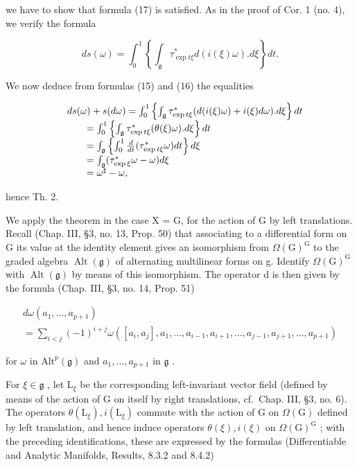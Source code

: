 we have to show that formula (17) is satisfied. As in the proof of Cor. 1 (no. 4), we verify the formula

\[
d s (\omega) = \int_ {0} ^ {1} \left\{\int_ {\mathfrak {g}} \tau_ {\exp t \xi} ^ {*} d (i (\xi) \omega). d \xi \right\} d t.
\]

We now deduce from formulas (15) and (16) the equalities

\[
\begin{array}{r l} & {d s (\omega) + s (d \omega) = \int_ {0} ^ {1} \left\{\int_ {\mathfrak {g}} \tau_ {\exp t \xi} ^ {*} (d (i (\xi) \omega) + i (\xi) d \omega). d \xi \right\} d t} \\ & {\qquad = \int_ {0} ^ {1} \left\{\int_ {\mathfrak {g}} \tau_ {\exp t \xi} ^ {*} (\theta (\xi) \omega). d \xi \right\} d t} \\ & {\qquad = \int_ {\mathfrak {g}} \left\{\int_ {0} ^ {1} \frac {d}{d t} (\tau_ {\exp t \xi} ^ {*} \omega) d t \right\} d \xi} \\ & {\qquad = \int_ {\mathfrak {g}} (\tau_ {\exp \xi} ^ {*} \omega - \omega) d \xi} \\ & {\qquad = \omega^ {\sharp} - \omega ,} \end{array}
\]

hence Th. 2.

We apply the theorem in the case X = G, for the action of G by left translations. Recall (Chap. III, §3, no. 13, Prop. 50) that associating to a differential form on G its value at the identity element gives an isomorphism from \(\Omega(\mathrm{G})^{\mathrm{G}}\) to the graded algebra \(\operatorname{Alt}(\mathfrak{g})\) of alternating multilinear forms on g. Identify \(\Omega(\mathrm{G})^{\mathrm{G}}\) with \(\operatorname{Alt}(\mathfrak{g})\) by means of this isomorphism. The operator d is then given by the formula (Chap. III, §3, no. 14, Prop. 51)

\[
\begin{array}{l} d \omega (a _ {1}, \ldots , a _ {p + 1}) \\ = \sum_ {i <   j} (- 1) ^ {i + j} \omega ([ a _ {i}, a _ {j} ], a _ {1}, \ldots , a _ {i - 1}, a _ {i + 1}, \ldots , a _ {j - 1}, a _ {j + 1}, \ldots , a _ {p + 1}) \end{array}
\]

for \(\omega\) in \(\mathrm{Alt}^p (\mathfrak{g})\) and \(a_1,\ldots ,a_{p + 1}\) in \(\mathfrak{g}\) .

For \(\xi \in \mathfrak{g}\) , let \(\mathrm{L}_{\xi}\) be the corresponding left-invariant vector field (defined by means of the action of G on itself by right translations, cf.~Chap. III, §3, no. 6). The operators \(\theta (\mathrm{L}_{\xi}), i(\mathrm{L}_{\xi})\) commute with the action of G on \(\Omega (\mathrm{G})\) defined by left translation, and hence induce operators \(\theta (\xi), i(\xi)\) on \(\Omega (\mathrm{G})^{\mathrm{G}}\) ; with the preceding identifications, these are expressed by the formulas (Differentiable and Analytic Manifolds, Results, 8.3.2 and 8.4.2)

